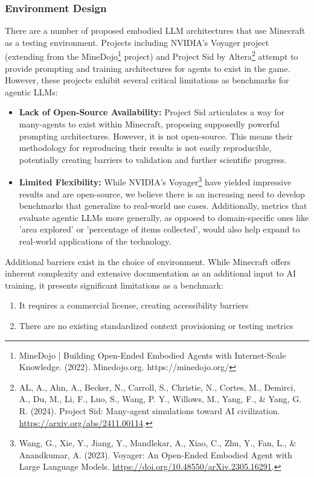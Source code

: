 \documentclass{article}
\begin{document}
\subsubsection{Environment Design}
There are a number of proposed embodied LLM architectures that use Minecraft as a testing environment.
Projects including NVIDIA's Voyager project (extending from the MineDojo\footnote{MineDojo | Building Open-Ended Embodied Agents with Internet-Scale Knowledge. (2022). Minedojo.org. https://minedojo.org/} project) and Project Sid by Altera\footnote{AL, A., Ahn, A., Becker, N., Carroll, S., Christie, N., Cortes, M., Demirci, A., Du, M., Li, F., Luo, S., Wang, P. Y., Willows, M., Yang, F., \& Yang, G. R. (2024). Project Sid: Many-agent simulations toward AI civilization. \url{https://arxiv.org/abs/2411.00114}.} attempt to provide prompting and training architectures for agents to exist in the game.
However, these projects exhibit several critical limitations as benchmarks for agentic LLMs:
\begin{itemize}[noitemsep,topsep=0pt]
    \item \textbf{Lack of Open-Source Availability:}
          Project Sid articulates a way for many-agents to exist within Minecraft, proposing supposedly powerful prompting architectures.
          However, it is not open-source.
          This means their methodology for reproducing their results is not easily reproducible, potentially creating barriers to validation and further scientific progress.
    \item \textbf{Limited Flexibility:}
          While NVIDIA's Voyager\footnote{Wang, G., Xie, Y., Jiang, Y., Mandlekar, A., Xiao, C., Zhu, Y., Fan, L., \& Anandkumar, A. (2023). Voyager: An Open-Ended Embodied Agent with Large Language Models. \url{https://doi.org/10.48550/arXiv.2305.16291}.} have yielded impressive results and are open-source, we believe there is an increasing need to develop benchmarks that generalize to real-world use cases.
          Additionally, metrics that evaluate agentic LLMs more generally, as opposed to domain-specific ones like 'area explored' or 'percentage of items collected', would also help expand to real-world applications of the technology.
\end{itemize}

\vspace{-0.5em}
Additional barriers exist in the choice of environment.
While Minecraft offers inherent complexity and extensive documentation as an additional input to AI training, it presents significant limitations as a benchmark:
\begin{enumerate}[noitemsep]
    \item It requires a commercial license, creating accessibility barriers
    \item There are no existing standardized context provisioning or testing metrics
\end{enumerate}
\end{document}
